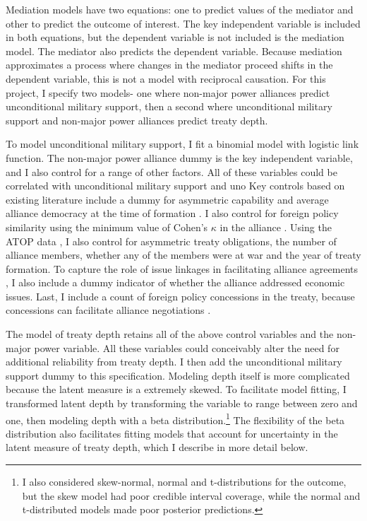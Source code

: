 \documentclass[12pt]{article}
\begin{document}
Mediation models have two equations: one to predict values of the mediator and other to predict the outcome of interest. 
The key independent variable is included in both equations, but the dependent variable is not included is the mediation model. 
The mediator also predicts the dependent variable. 
Because mediation approximates a process where changes in the mediator proceed shifts in the dependent variable, this is not a model with reciprocal causation. 
For this project, I specify two models- one where non-major power alliances predict unconditional military support, then a second where unconditional military support and non-major power alliances predict treaty depth. 


To model unconditional military support, I fit a binomial model with logistic link function. 
The non-major power alliance dummy is the key independent variable, and I also control for a range of other factors.
All of these variables could be correlated with unconditional military support and uno
Key controls based on existing literature include a dummy for asymmetric capability \citep{Mattes2012} and average alliance democracy at the time of formation \citep{Chibaetal2015}. 
I also control for foreign policy similarity \citep{Benson2012} using the minimum value of Cohen's $\kappa$ in the alliance \citep{Hage2011}.
Using the ATOP data \citep{Leedsetal2002}, I also control for asymmetric treaty obligations, the number of alliance members, whether any of the members were at war and the year of treaty formation. 
To capture the role of issue linkages in facilitating alliance agreements \citep{Poast2012, Poast2013}, I also include a dummy indicator of whether the alliance addressed economic issues.  
Last, I include a count of foreign policy concessions in the treaty, because concessions can facilitate alliance negotiations \citep{Johnson2015}. 


The model of treaty depth retains all of the above control variables and the non-major power variable. 
All these variables could conceivably alter the need for additional reliability from treaty depth. 
I then add the unconditional military support dummy to this specification. 
Modeling depth itself is more complicated because the latent measure is a extremely skewed.
To facilitate model fitting, I transformed latent depth by transforming the variable to range between zero and one, then modeling depth with a beta distribution.\footnote{I also considered skew-normal, normal and t-distributions for the outcome, but the skew model had poor credible interval coverage, while the normal and t-distributed models made poor posterior predictions.}
The flexibility of the beta distribution also facilitates fitting models that account for uncertainty in the latent measure of treaty depth, which I describe in more detail below. 
\end{document}

